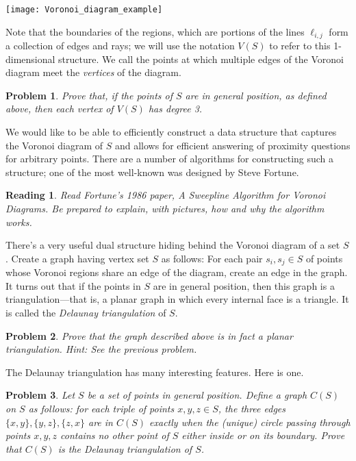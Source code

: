 \documentclass[11pt]{article}
\newtheorem{problem}{Problem}
\newtheorem{reading}{Reading}
\begin{document}
\begin{center}
\texttt{[image: Voronoi\_diagram\_example]}
\end{center}

Note that the boundaries of the regions, which are portions of the lines $\ell_{i,j}$ form a collection of edges and rays;
we will use the notation $V(S)$ to refer to this 1-dimensional structure. We call the points at which multiple edges of
the Voronoi diagram meet the {\em vertices} of the diagram.
\begin{problem}
Prove that, if the points of $S$ are in general position, as defined above, then each vertex of $V(S)$ has degree 3.
\end{problem}

We would like to be able to efficiently construct a data structure that captures the Voronoi diagram of $S$ and allows
for efficient answering of proximity questions for arbitrary points.  There are a number of algorithms for constructing
such a structure; one of the most well-known was designed by Steve Fortune.

\begin{reading}
Read Fortune's 1986 paper, {\em A Sweepline Algorithm for Voronoi Diagrams}. Be prepared to explain, with pictures, how and why the algorithm works.
\end{reading}

There's a very useful dual structure hiding behind the Voronoi diagram of a set $S$. Create a graph having vertex set
$S$ as follows: For each pair $s_i, s_j \in S$ of points whose Voronoi regions share an edge of the diagram, create an edge in the graph.  It turns out that if the points in $S$ are in general position, then this graph is a triangulation---that is, a planar
graph in which every internal face is a triangle. It is called the {\em Delaunay triangulation} of $S$.

\begin{problem}
Prove that the graph described above is in fact a planar triangulation. Hint: See the previous problem.
\end{problem}

The Delaunay triangulation has many interesting features. Here is one.
\begin{problem}
Let $S$ be a set of points in general position. Define a graph $C(S)$ on $S$ as follows: for each triple of points
$x,y,z \in S$, the three edges $\{x,y\}, \{y,z\}, \{z,x\}$ are in $C(S)$ exactly when the (unique) circle passing through
points $x,y,z$ contains no other point of $S$ either inside or on its boundary.  Prove that $C(S)$ is the Delaunay
triangulation of $S$.
\end{problem}
\end{document}
